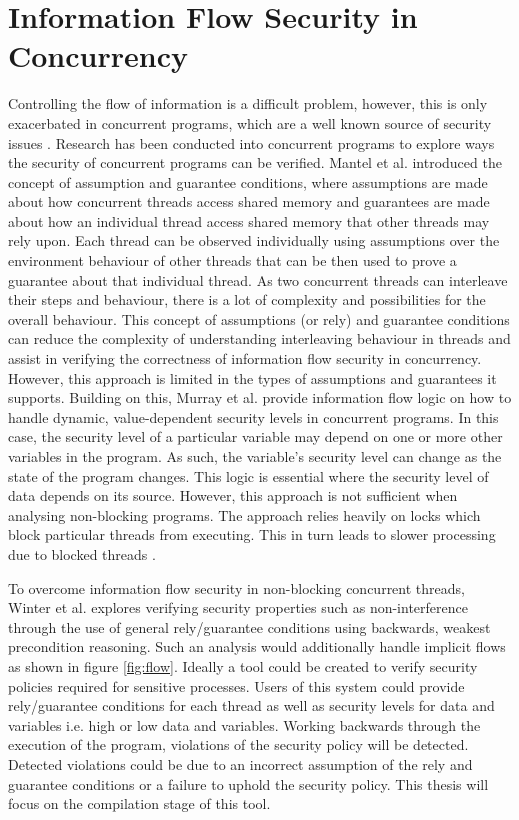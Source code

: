 \documentclass[twocolumn]{article}
\begin{document}
\section{Information Flow Security in Concurrency}
Controlling the flow of information is a difficult problem, however, this is only exacerbated in concurrent programs, which are a well known source of security issues \cite{mantel2014noninterference}\cite{smith2019value}\cite{vaughan2012secure}. Research has been conducted into concurrent programs to explore ways the security of concurrent programs can be verified. Mantel et al. \cite{mantel2011assumptions} introduced the concept of assumption and guarantee conditions, where assumptions are made about how concurrent threads access shared memory and guarantees are made about how an individual thread access shared memory that other threads may rely upon. Each thread can be observed individually using assumptions over the environment behaviour of other threads that can be then used to prove a guarantee about that individual thread. As two concurrent threads can interleave their steps and behaviour, there is a lot of complexity and possibilities for the overall behaviour. This concept of assumptions (or rely) and guarantee conditions can reduce the complexity of understanding interleaving behaviour in threads and assist in verifying the correctness of information flow security in concurrency. However, this approach is limited in the types of assumptions and guarantees it supports. Building on this, Murray et al. \cite{ernst2019seccsl} \cite{murray2018covern} provide information flow logic on how to handle dynamic, value-dependent security levels in concurrent programs. In this case, the security level of a particular variable may depend on one or more other variables in the program. As such, the variable's security level can change as the state of the program changes. This logic is essential where the security level of data depends on its source. However, this approach is not sufficient when analysing non-blocking programs. The approach relies heavily on locks which block particular threads from executing. This in turn leads to slower processing due to blocked threads \cite{prakash1991non}.

To overcome information flow security in non-blocking concurrent threads, Winter et al. \cite{winter2020information} explores verifying security properties such as non-interference through the use of general rely/guarantee conditions using backwards, weakest precondition reasoning. Such an analysis would additionally handle implicit flows as shown in figure \ref{fig:flow}. Ideally a tool could be created to verify security policies required for sensitive processes. Users of this system could provide rely/guarantee conditions for each thread as well as security levels for data and variables i.e. high or low data and variables. Working backwards through the execution of the program, violations of the security policy will be detected. Detected violations could be due to an incorrect assumption of the rely and guarantee conditions or a failure to uphold the security policy. This thesis will focus on the compilation stage of this tool.
\end{document}

